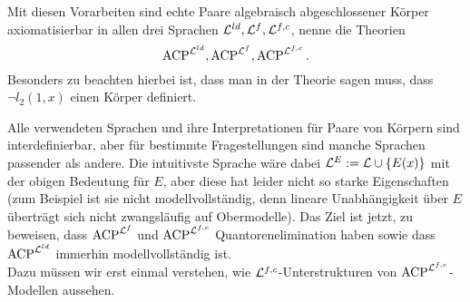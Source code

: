     \begin{lemma}
    	Mit diesen Vorarbeiten sind echte Paare algebraisch abgeschlossener Körper axiomatisierbar in allen drei Sprachen $\mathcal{L}^{ld},\mathcal{L}^f,\mathcal{L}^{f,c}$, nenne die Theorien $$\operatorname{ACP}^{\mathcal{L}^{ld}},\operatorname{ACP}^{\mathcal{L}^f},\operatorname{ACP}^{\mathcal{L}^{f,c}}.$$ Besonders zu beachten hierbei ist, dass man in der Theorie sagen muss, dass $\neg l_2(1,x)$ einen Körper definiert.
    \end{lemma}
    
    Alle verwendeten Sprachen und ihre Interpretationen für Paare von Körpern sind interdefinierbar, aber für bestimmte Fragestellungen sind manche Sprachen passender als andere. Die intuitivste Sprache wäre dabei $\mathcal{L}^E:=\mathcal{L}\cup\{E(x)\}$ mit der obigen Bedeutung für $E$, aber diese hat leider nicht so starke Eigenschaften (zum Beispiel ist sie nicht modellvollständig, denn lineare Unabhängigkeit über $E$ überträgt sich nicht zwangsläufig auf Obermodelle). Das Ziel ist jetzt, zu beweisen, dass $\operatorname{ACP}^{\mathcal{L}^f}$ und $\operatorname{ACP}^{\mathcal{L}^{f,c}}$ Quantoren\-eli\-mi\-na\-tion haben sowie dass $\operatorname{ACP}^{\mathcal{L}^{ld}}$ immerhin modellvollständig ist.\\
    Dazu müssen wir erst einmal verstehen, wie $\mathcal{L}^{f,c}$-Unterstrukturen von $\operatorname{ACP}^{\mathcal{L}^{f,c}}$-Modellen aussehen.
    
